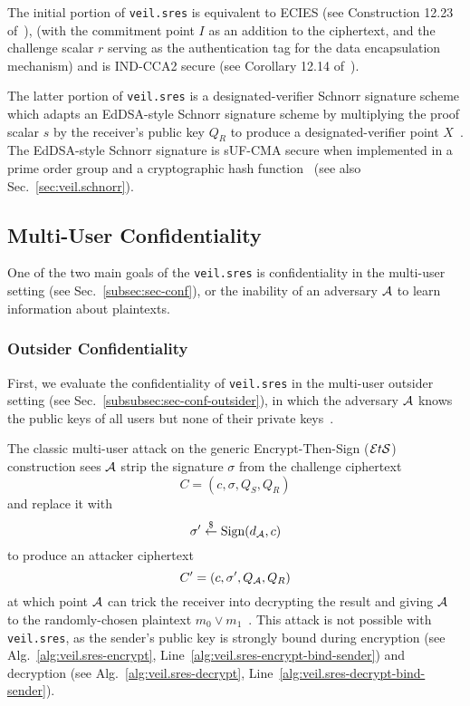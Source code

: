 The initial portion of \texttt{veil.sres} is equivalent to ECIES (see Construction 12.23 of~\cite[p.
    435]{katz2020}), \@(with the commitment point $I$ as an addition to the ciphertext, and the
challenge scalar $r$ serving as the authentication tag for the data encapsulation mechanism) and is
IND-CCA2 secure (see Corollary 12.14 of~\cite[p. 436]{katz2020}).

The latter portion of \texttt{veil.sres} is a designated-verifier Schnorr signature scheme which
adapts an EdDSA-style Schnorr signature scheme by multiplying the proof scalar $s$ by the receiver's
public key $Q_R$ to produce a designated-verifier point $X$~\cite{steinfeld2004}. The EdDSA-style
Schnorr signature is sUF-CMA secure when implemented in a prime order group and a cryptographic hash
function~\cite{brendel2021, chalkias2020, pointcheval2000, neven2009} (see also
Sec.~\ref{sec:veil.schnorr})\@.

\subsection{Multi-User Confidentiality}\label{subsec:veil.sres-conf}

One of the two main goals of the \texttt{veil.sres} is confidentiality in the multi-user setting
(see Sec.~\ref{subsec:sec-conf}), or the inability of an adversary $\mathcal{A}$ to learn information
about plaintexts.

\subsubsection{Outsider Confidentiality}

First, we evaluate the confidentiality of \texttt{veil.sres} in the multi-user outsider setting (see
Sec.~\ref{subsubsec:sec-conf-outsider}), in which the adversary $\mathcal{A}$ knows the public keys
of all users but none of their private keys~\cite[p. 44]{baek2010}\@.

The classic multi-user attack on the generic Encrypt-Then-Sign ($\mathcal{E}t\mathcal{S}$) construction sees
$\mathcal{A}$ strip the signature $\sigma$ from the challenge ciphertext
\[
    C=(c,\sigma,Q_S,Q_R)
\]
and replace it with
\[
    \sigma' \stackrel{\$}{\gets} \text{Sign}(d_{\mathcal{A}},c)
\]
to produce an attacker ciphertext
\[
    C'=(c,\sigma',Q_{\mathcal{A}},Q_R)
\]
at which point $\mathcal{A}$ can trick the receiver into decrypting the result and giving
$\mathcal{A}$ to the randomly-chosen plaintext $m_0 \lor m_1$~\cite[p. 40]{an2010}. This attack is
not possible with \texttt{veil.sres}\@, as the sender's public key is strongly bound during
encryption (see Alg.~\ref{alg:veil.sres-encrypt}, Line~\ref{alg:veil.sres-encrypt-bind-sender}) and
decryption (see Alg.~\ref{alg:veil.sres-decrypt}, Line~\ref{alg:veil.sres-decrypt-bind-sender}).

